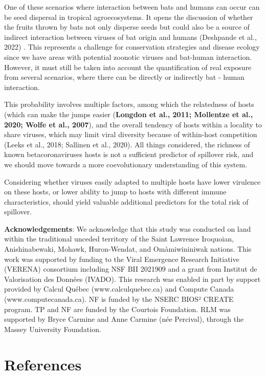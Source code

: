 \documentclass[11pt]{article}
\begin{document}
One of these scenarios where interaction between bats and humans can
occur can be seed dispersal in tropical agroecosystems. It opens the
discussion of whether the fruits thrown by bats not only disperse seeds
but could also be a source of indirect interaction between viruses of
bat origin and humans (Deshpande et al., 2022) . This represents a
challenge for conservation strategies and disease ecology since we have
areas with potential zoonotic viruses and bat-human interaction.
However, it must still be taken into account the quantification of real
exposure from several scenarios, where there can be directly or
indirectly bat - human interaction.

This probability involves multiple factors, among which the relatedness
of hosts (which can make the jumps easier (\textbf{Longdon et al., 2011;
Mollentze et al., 2020; Wolfe et al., 2007}), and the overall tendency
of hosts within a locality to share viruses, which may limit viral
diversity because of within-host competition (Leeks et al., 2018;
Sallinen et al., 2020). All things considered, the richness of known
betacoronaviruses hosts is not a sufficient predictor of spillover risk,
and we should move towards a more coevolutionary understanding of this
system.

Considering whether viruses easily adapted to multiple hosts have lower
virulence on these hosts, or lower ability to jump to hosts with
different immune characteristics, should yield valuable additional
predictors for the total risk of spillover.

\textbf{Acknowledgements}: We acknowledge that this study was conducted
on land within the traditional unceded territory of the Saint Lawrence
Iroquoian, Anishinabewaki, Mohawk, Huron-Wendat, and Omàmiwininiwak
nations. This work was supported by funding to the Viral Emergence
Research Initiative (VERENA) consortium including NSF BII 2021909 and a
grant from Institut de Valorisation des Données (IVADO). This research
was enabled in part by support provided by Calcul Québec
(www.calculquebec.ca) and Compute Canada (www.computecanada.ca). NF is
funded by the NSERC BIOS² CREATE program. TP and NF are funded by the
Courtois Foundation. RLM was supported by Bryce Carmine and Anne Carmine
(née Percival), through the Massey University Foundation.

\hypertarget{references}{%
\section*{References}\label{references}}
\end{document}
